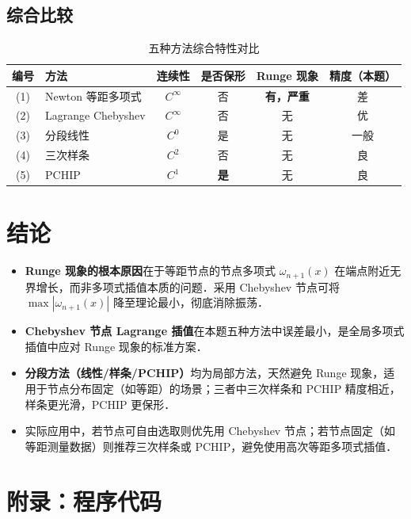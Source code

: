 \documentclass[UTF8,a4paper,11pt]{article}
\begin{document}
\subsection{综合比较}

\begin{table}[H]
\centering
\caption{五种方法综合特性对比}
\label{tab:compare}
\begin{tabular}{clcccc}
\toprule
编号 & 方法 & 连续性 & 是否保形 & Runge 现象 & 精度（本题）\\
\midrule
(1) & Newton 等距多项式  & $C^\infty$ & 否 & \textbf{有，严重} & 差 \\
(2) & Lagrange Chebyshev & $C^\infty$ & 否 & 无 & 优 \\
(3) & 分段线性           & $C^0$      & 是 & 无 & 一般 \\
(4) & 三次样条           & $C^2$      & 否 & 无 & 良 \\
(5) & PCHIP              & $C^1$      & \textbf{是} & 无 & 良 \\
\bottomrule
\end{tabular}
\end{table}

\section{结论}

\begin{itemize}
  \item \textbf{Runge 现象的根本原因}在于等距节点的节点多项式 $\omega_{n+1}(x)$ 在端点附近无界增长，而非多项式插值本质的问题．采用 Chebyshev 节点可将 $\max|\omega_{n+1}(x)|$ 降至理论最小，彻底消除振荡．
  \item \textbf{Chebyshev 节点 Lagrange 插值}在本题五种方法中误差最小，是全局多项式插值中应对 Runge 现象的标准方案．
  \item \textbf{分段方法（线性/样条/PCHIP）}均为局部方法，天然避免 Runge 现象，适用于节点分布固定（如等距）的场景；三者中三次样条和 PCHIP 精度相近，样条更光滑，PCHIP 更保形．
  \item 实际应用中，若节点可自由选取则优先用 Chebyshev 节点；若节点固定（如等距测量数据）则推荐三次样条或 PCHIP，避免使用高次等距多项式插值．
\end{itemize}

\clearpage

\section{附录：程序代码}
\end{document}
